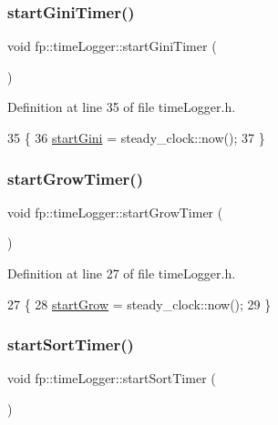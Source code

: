 \subsubsection{\texorpdfstring{start\+Gini\+Timer()}{startGiniTimer()}}
{\footnotesize\ttfamily void fp\+::time\+Logger\+::start\+Gini\+Timer (\begin{DoxyParamCaption}{ }\end{DoxyParamCaption})\hspace{0.3cm}{\ttfamily [inline]}}



Definition at line 35 of file time\+Logger.\+h.


\begin{DoxyCode}
35                             \{
36 \hyperlink{classfp_1_1timeLogger_abe0bd7eeb79ad8c33747afb4f4a99e88}{startGini} = steady\_clock::now();
37                 \}
\end{DoxyCode}
\mbox{\label{classfp_1_1timeLogger_ab6ae96d6c08b46531417915f1b120060}} 
\subsubsection{\texorpdfstring{start\+Grow\+Timer()}{startGrowTimer()}}
{\footnotesize\ttfamily void fp\+::time\+Logger\+::start\+Grow\+Timer (\begin{DoxyParamCaption}{ }\end{DoxyParamCaption})\hspace{0.3cm}{\ttfamily [inline]}}



Definition at line 27 of file time\+Logger.\+h.


\begin{DoxyCode}
27                                             \{
28 \hyperlink{classfp_1_1timeLogger_a530aa42af210e19fbab96c998271dbc4}{startGrow} = steady\_clock::now();
29                 \}
\end{DoxyCode}
\mbox{\label{classfp_1_1timeLogger_a53d2260809f92b6884e6cbf4cdf89c2e}} 
\subsubsection{\texorpdfstring{start\+Sort\+Timer()}{startSortTimer()}}
{\footnotesize\ttfamily void fp\+::time\+Logger\+::start\+Sort\+Timer (\begin{DoxyParamCaption}{ }\end{DoxyParamCaption})\hspace{0.3cm}{\ttfamily [inline]}}



